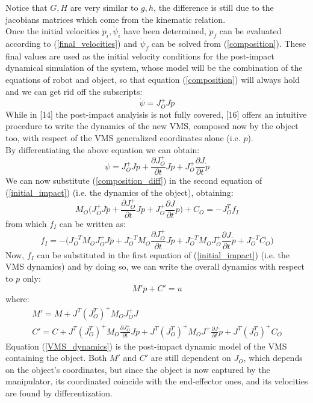 \documentclass[a4paper,12pt,oneside]{report}
\begin{document}
Notice that $G,H$ are very similar to $g,h$, the difference is still due to the jacobians matrices which come from the kinematic relation.\\
Once the initial velocities $\dot{p}_i,\dot{\psi}_i$ have been determined, $\dot{p}_f$ can be evaluated according to (\ref{final_velocities}) and $\dot{\psi}_f$ can be solved from (\ref{composition}). These final values are used as the initial velocity conditions for the post-impact dynamical simulation of the system, whose model will be the combination of the equations of robot and object, so that equation (\ref{composition}) will always hold and we can get rid off the subscripts:
\begin{equation}
  \dot{\psi}=J_O^+J\dot{p}
\end{equation}
While in [14] the post-impact analyisis is not fully covered, [16] offers an intuitive procedure to write the dynamics of the new VMS, composed now by the object too, with respect of the VMS generalized coordinates alone (i.e. $p$).\\ 
By differentiating the above equation we can obtain:
\begin{equation}
  \ddot{\psi}=J_O^+J\ddot{p}+\frac{\partial J_O^+}{\partial t}J\dot{p}+J_O^+\frac{\partial J}{\partial t}\dot{p}
  \label{composition_diff}
\end{equation}
We can now substitute (\ref{composition_diff}) in the second equation of (\ref{initial_impact}) (i.e. the dynamics of the object), obtaining:
\begin{equation}
  M_O\Big(J_O^+J\ddot{p}+\frac{\partial J_O^+}{\partial t}J\dot{p}+J_O^+\frac{\partial J}{\partial t}\dot{p}\Big)+C_O=-J_O^Tf_I
\end{equation}
from which $f_I$ can be written as:
\begin{equation}
  f_I=-\Big(J_O^{-T}M_OJ_O^+J\ddot{p}+J_O^{-T}M_O\frac{\partial J_O^+}{\partial t}J\dot{p}+J_O^{-T}M_OJ_O^+\frac{\partial J}{\partial t}\dot{p}+J_O^{-T}C_O\Big)
\end{equation}
Now, $f_I$ can be substituted in the first equation of (\ref{initial_impact}) (i.e. the VMS dynamics) and by doing so, we can write the overall dynamics with respect to $p$ only:
\begin{equation}
  M'\ddot{p}+C'=u
  \label{final_equation_motion}
\end{equation}
where:
\begin{equation}
  \begin{array}{l}
    M'=M+J^T(J_O^T)^+M_OJ_O^+J\\
    C'=C+J^T(J_O^T)^+M_O\frac{\partial J_O^+}{\partial t}J\dot{p}+J^T(J_O^T)^+M_OJ^+\frac{\partial J}{\partial t}\dot{p}+J^T(J_O^T)^+C_O
  \end{array}
  \label{VMS_dynamics}
\end{equation}
Equation (\ref{VMS_dynamics}) is the post-impact dynamic model of the VMS containing the object. Both $M'$ and $C'$ are still dependent on $J_O$, which depends on the object's coordinates, but since the object is now captured by the manipulator, its coordinated coincide with the end-effector ones, and its velocities are found by differentization.
\newpage
\FloatBarrier
\end{document}
